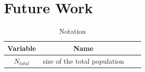 \documentclass[conference]{IEEEtran}
\begin{document}
 \section{Future Work}  
   
  \begin{table}[H]
    
    \centering
      \begin{tabular}{cccc}
      \toprule
      Variable&Name\\
      \midrule
     
      $N_{total}$&size of the total population\\
  \bottomrule
  \end{tabular}
  \caption{Notation}
  \label{table:1}
  \end{table}



\end{document}
